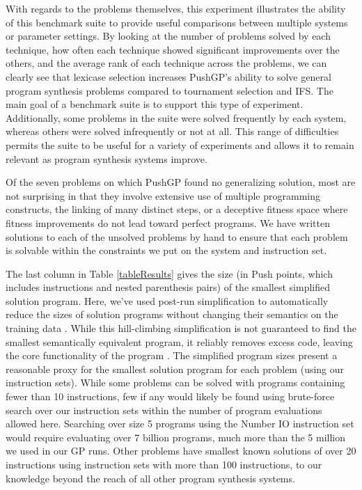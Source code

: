 \documentclass{sig-alternate}
\begin{document}
With regards to the problems themselves, this experiment illustrates the ability of this benchmark suite to provide useful comparisons between multiple systems or parameter settings. By looking at the number of problems solved by each technique, how often each technique showed significant improvements over the others, and the average rank of each technique across the problems, we can clearly see that lexicase selection increases PushGP's ability to solve general program synthesis problems compared to tournament selection and IFS. The main goal of a benchmark suite is to support this type of experiment. Additionally, some problems in the suite were solved frequently by each system, whereas others were solved infrequently or not at all. This range of difficulties permits the suite to be useful for a variety of experiments and allows it to remain relevant as program synthesis systems improve.

Of the seven problems on which PushGP found no generalizing solution, most are not surprising in that they involve extensive use of multiple programming constructs, the linking of many distinct steps, or a deceptive fitness space where fitness improvements do not lead toward perfect programs. 
We have written solutions to each of the unsolved problems by hand to ensure that each problem is solvable within the constraints we put on the system and instruction set.


The last column in Table \ref{tableResults} gives the size (in Push points, which includes instructions and nested parenthesis pairs) of the  smallest simplified solution program. Here, we've used post-run simplification to automatically reduce the sizes of solution programs without changing their semantics on the training data \cite{Spector:2014:GECCOcomp}. While this hill-climbing simplification is not guaranteed to find the smallest semantically equivalent program, it reliably removes excess code, leaving the core functionality of the program \cite{Spector:2014:GECCOcomp}. The simplified program sizes present a reasonable proxy for the smallest solution program for each problem (using our instruction sets). While some problems can be solved with programs containing fewer than 10 instructions, few if any would likely be found using brute-force search over our instruction sets within the number of program evaluations allowed here. Searching over size 5 programs using the Number IO instruction set would require evaluating over 7 billion programs, much more than the 5 million we used in our GP runs. Other problems have smallest known solutions of over 20 instructions using instruction sets with more than 100 instructions, to our knowledge beyond the reach of all other program synthesis systems.
\end{document}
